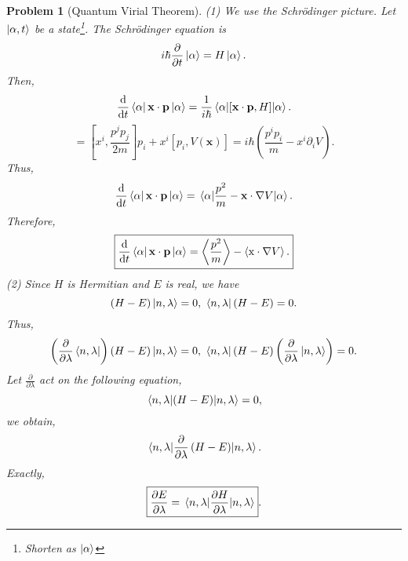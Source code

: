 \documentclass{article}
\theoremstyle{1}
\newtheorem{problem}{Problem}
\newcommand{\pa}{\partial}
\begin{document}
\begin{problem}[Quantum Virial Theorem]
    (1) We use the Schr\"odinger picture. Let $\ket{\alpha,t}$ be a state\footnote{Shorten as $\ket{\alpha}$}. The Schr\"odinger equation is
    \begin{equation}
        i\hbar \frac{\pa}{\pa t}\ket{\alpha}=H\ket{\alpha}.
    \end{equation}
    Then,
    \begin{equation}
        \frac{\dd}{\dd{t}}\bra{\alpha}\mathbf{x}\cdot\mathbf{p}\ket{\alpha}=\frac{1}{i\hbar}\expval{[\mathbf{x}\cdot\mathbf{p},H]}{\alpha}.
    \end{equation}
    \begin{equation}
        [x^ip_i,\frac{p^jp_j}{2m}+V(\mathbf{x})]=[x^i,\frac{p^jp_j}{2m}]p_i+x^i[p_i,V(\mathbf{x})]=i \hbar\left(\frac{p^ip_i}{m}-x^i\pa _i V\right).
    \end{equation}
    Thus,
    \begin{equation}
         \frac{\dd}{\dd{t}}\bra{\alpha}\mathbf{x}\cdot\mathbf{p}\ket{\alpha}=\expval{\frac{p^2}{m}-\mathbf{x}\cdot \nabla V}{\alpha}.
    \end{equation}
    Therefore,
    \begin{equation}
        \boxed{ \frac{\dd}{\dd{t}}\bra{\alpha}\mathbf{x}\cdot\mathbf{p}\ket{\alpha}=\expval{\frac{p^2}{m}}-\expval{\mathrm{x}\cdot\nabla V}.}
    \end{equation}
    (2) Since $H$ is Hermitian and $E$ is real, we have 
    \begin{equation}
      (H-E)  \ket{n,\lambda}=0,\ \bra{n,\lambda}(H-E)=0.
    \end{equation}
    Thus, 
    \begin{equation}
        \left(\frac{\pa}{\pa \lambda}\bra{n,\lambda}\right)(H-E)\ket{n,\lambda}=0,\ \bra{n,\lambda}(H-E)\left(\frac{\pa}{\pa \lambda}\ket{n,\lambda}\right)=0.
    \end{equation}
    Let $\frac{\pa}{\pa \lambda}$ act on the following equation,
    \begin{equation}
        \expval{(H-E)}{n,\lambda}=0,
    \end{equation}
    we obtain, 
    \begin{equation}
        \expval{\frac{\pa}{\pa \lambda}\left(H-E\right)}{n,\lambda}.
    \end{equation}
    Exactly,
    \begin{equation}
        \boxed{\frac{\pa E}{\pa \lambda}=\expval{\frac{\pa H}{\pa \lambda}}{n,\lambda}}.
    \end{equation}

\end{problem}
\end{document}
